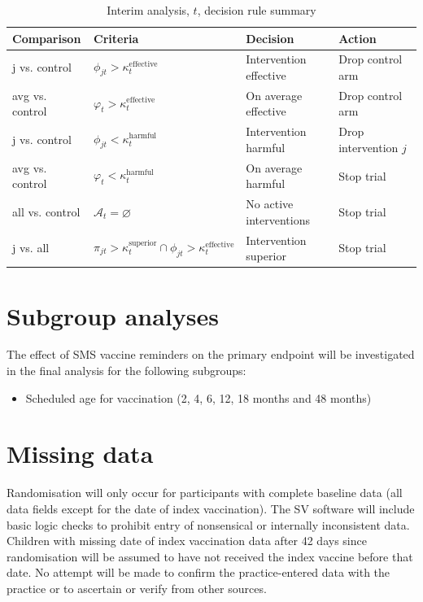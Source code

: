 \documentclass[
  bibliography=totoc]{scrreprt}
\providecommand{\tightlist}{%
  \setlength{\itemsep}{0pt}\setlength{\parskip}{0pt}}
\begin{document}
\begin{table}[H]

\caption{\label{tab:decrules}Interim analysis, $t$, decision rule summary}
\centering
\fontsize{10}{12}\selectfont
\begin{tabular}[t]{llll}
\toprule
Comparison & Criteria & Decision & Action\\
\midrule
j vs. control & $\phi_{jt}>\kappa_t^{\text{effective}}$ & Intervention effective & Drop control arm\\
avg vs. control & $\varphi_t > \kappa_t^{\text{effective}}$ & On average effective & Drop control arm\\
j vs. control & $\phi_{jt}<\kappa_t^{\text{harmful}}$ & Intervention harmful & Drop intervention $j$\\
avg vs. control & $\varphi_t < \kappa_t^{\text{harmful}}$ & On average harmful & Stop trial\\
all vs. control & $\mathcal{A}_t=\varnothing$ & No active interventions & Stop trial\\
j vs. all & $\pi_{jt}>\kappa_t^{\text{superior}} \cap \phi_{jt}>\kappa_t^{\text{effective}}$ & Intervention superior & Stop trial\\
\bottomrule
\end{tabular}
\end{table}

\hypertarget{subgroup-analyses}{%
\section{Subgroup analyses}\label{subgroup-analyses}}

The effect of SMS vaccine reminders on the primary endpoint will be investigated in the final analysis for the following subgroups:

\begin{itemize}
\tightlist
\item
  Scheduled age for vaccination (2, 4, 6, 12, 18 months and 48 months)
\end{itemize}

\hypertarget{missing-data}{%
\section{Missing data}\label{missing-data}}

Randomisation will only occur for participants with complete baseline data (all data fields except for the date of index vaccination).
The SV software will include basic logic checks to prohibit entry of nonsensical or internally inconsistent data.
Children with missing date of index vaccination data after 42 days since randomisation will be assumed to have not received the index vaccine before that date.
No attempt will be made to confirm the practice-entered data with the practice or to ascertain or verify from other sources.
\end{document}
